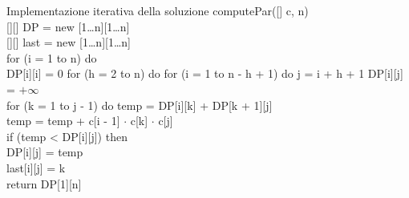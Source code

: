\begin{minicode}{Implementazione iterativa della soluzione}
\ind{} computePar([] c,  n)\\
    [][] DP = new [1\dots n][1\dots n]\\
    [][] last = new [1\dots n][1\dots n]\\
    \indf for (i = 1 to n) do\\
        DP[i][i] = 0\hfill{}
    \indf for (h = 2 to n) do\hfill{}
        \indff for (i = 1 to n - h + 1) do\hfill{}
             j = i + h + 1\hfill{}
            DP[i][j] = $+\infty$\\
            \indfff for (k = 1 to j - 1) do\hfill{}
                 temp = DP[i][k] + DP[k + 1][j]\\
                temp = temp + c[i - 1] $\cdot$ c[k] $\cdot$ c[j]\\
                \indffff if (temp < DP[i][j]) then\\
                    DP[i][j] = temp\\
                    last[i][j] = k\\
    \indf return DP[1][n]
\end{minicode}

